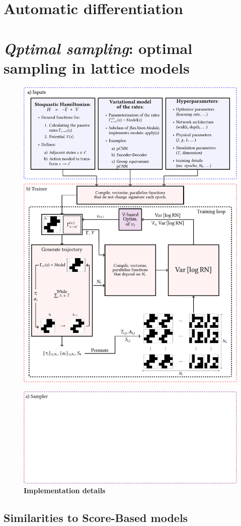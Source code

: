 \section{Automatic differentiation}
\label{subsec:gbopt-autograd}

\section[\emph{Qptimal sampling}]{\emph{Qptimal sampling}: optimal sampling in lattice models}
\begin{figure}[h]
	\centering
	\includegraphics[width=\linewidth]{Chapter4/Figs/Vector/qsampl1}
\end{figure}
\begin{figure}[t]
	\ContinuedFloat
	\centering
	\includegraphics[width=\linewidth]{Chapter4/Figs/Vector/qsampl2}
	\caption[Implementation details]{\textbf{Implementation details}}
	\label{fig:qsampl}
\end{figure}



\subsection{Similarities to Score-Based models}